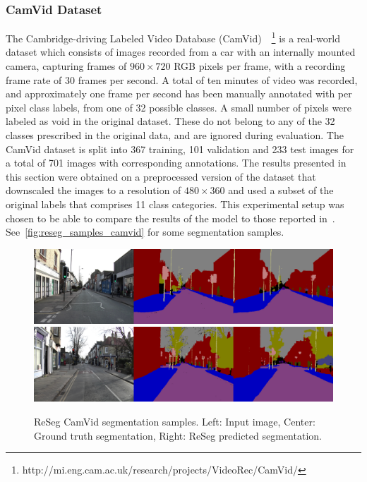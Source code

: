 \subsubsection{CamVid Dataset}\label{sec:reseg+camvid}
The Cambridge-driving Labeled Video Database (CamVid)~\citep{
Brostow2010semantic}~\footnote{%
http://mi.eng.cam.ac.uk/research/projects/VideoRec/CamVid/}
is a real-world dataset which consists of images recorded from a car with an
internally mounted camera, capturing frames of $960 \times 720$ RGB pixels per
frame, with a recording frame rate of 30 frames per second.  A total of ten
minutes of video was recorded, and approximately one frame per second has been
manually annotated with per pixel class labels, from one of 32 possible
classes. A small number of pixels were labeled as void in the original
dataset. These do not belong to any of the 32 classes prescribed in the
original data, and are ignored during evaluation. The CamVid dataset is split
into 367 training, 101 validation and 233 test images for a total of 701 images
with corresponding annotations. The results presented in this section were
obtained on a preprocessed version of the dataset that downscaled the images to
a resolution of $480 \times 360$ and used a subset of the original labels that
comprises 11 class categories. This experimental setup was chosen to be able to
compare the results of the model to those reported
in~\citep{badrinarayanan2015segnet}. See~\autoref{fig:reseg_samples_camvid} for
some segmentation samples.

\begin{figure}[t!]
    \centering
    \includegraphics[width=\textwidth]{img/reseg/samples/camvid1.png}\\
    \vspace{0.1em}
    \includegraphics[width=\textwidth]{img/reseg/samples/camvid2.png}
    \caption{ReSeg CamVid segmentation samples.
        Left: Input image, Center: Ground truth segmentation,
        Right: ReSeg predicted segmentation.}
    \label{fig:reseg_samples_camvid}
\end{figure}

